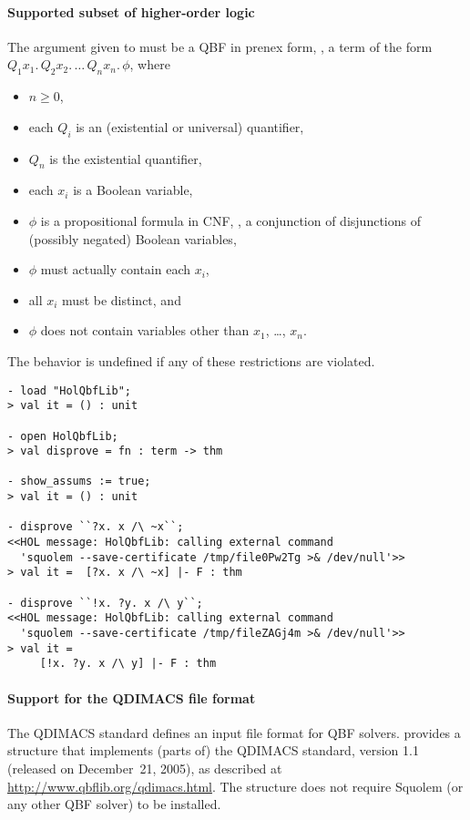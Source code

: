 \paragraph{Supported subset of higher-order logic}

The argument given to  must be a QBF in prenex form, \ie,
a term of the form $Q_1 x_1. \, Q_2 x_2. \, \ldots \, Q_n x_n. \,
\phi$, where
\begin{itemize}
\item $n \geq 0$,
\item each $Q_i$ is an (existential or universal) quantifier,
\item $Q_n$ is the existential quantifier,
\item each $x_i$ is a Boolean variable,
\item $\phi$ is a propositional formula in CNF, \ie, a conjunction of
  disjunctions of (possibly negated) Boolean variables,
\item $\phi$ must actually contain each $x_i$,
\item all $x_i$ must be distinct, and
\item $\phi$ does not contain variables other than $x_1$, \dots,
  $x_n$.
\end{itemize}
The behavior is undefined if any of these restrictions are violated.

\begin{session}
\begin{verbatim}
- load "HolQbfLib";
> val it = () : unit

- open HolQbfLib;
> val disprove = fn : term -> thm

- show_assums := true;
> val it = () : unit

- disprove ``?x. x /\ ~x``;
<<HOL message: HolQbfLib: calling external command
  'squolem --save-certificate /tmp/file0Pw2Tg >& /dev/null'>>
> val it =  [?x. x /\ ~x] |- F : thm

- disprove ``!x. ?y. x /\ y``;
<<HOL message: HolQbfLib: calling external command
  'squolem --save-certificate /tmp/fileZAGj4m >& /dev/null'>>
> val it =
     [!x. ?y. x /\ y] |- F : thm
\end{verbatim}
\end{session}

\paragraph{Support for the QDIMACS file format}

The QDIMACS standard defines an input file format for QBF solvers.
 provides a structure  that implements
(parts of) the QDIMACS standard, version 1.1 (released on December~21,
2005), as described at \url{http://www.qbflib.org/qdimacs.html}.  The
 structure does not require Squolem (or any other QBF
solver) to be installed.


